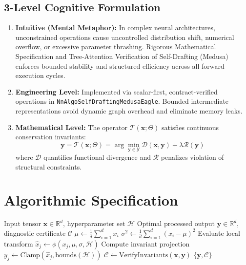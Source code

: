 \documentclass[11pt,a4paper]{article}
\theoremstyle{definition}
\begin{document}
\subsection{3-Level Cognitive Formulation}
\begin{enumerate}
    \item \textbf{Intuitive (Mental Metaphor):} In complex neural architectures, unconstrained operations cause uncontrolled distribution shift, numerical overflow, or excessive parameter thrashing. Rigorous Mathematical Specification and Tree-Attention Verification of Self-Drafting (Medusa) enforces bounded stability and structured efficiency across all forward execution cycles.
    \item \textbf{Engineering Level:} Implemented via scalar-first, contract-verified operations in \texttt{NnAlgoSelfDraftingMedusaEagle}. Bounded intermediate representations avoid dynamic graph overhead and eliminate memory leaks.
    \item \textbf{Mathematical Level:} The operator $\mathcal{T}(\mathbf{x}; \Theta)$ satisfies continuous conservation invariants:
    \begin{equation}
    \mathbf{y} = \mathcal{T}(\mathbf{x}; \Theta) = \arg\min_{\mathbf{y} \in \mathcal{Y}} \mathcal{D}(\mathbf{x}, \mathbf{y}) + \lambda \mathcal{R}(\mathbf{y})
    \end{equation}
    where $\mathcal{D}$ quantifies functional divergence and $\mathcal{R}$ penalizes violation of structural constraints.
\end{enumerate}

\section{Algorithmic Specification}

\begin{algorithm}[H]
\caption{Rigorous Mathematical Specification and Tree-Attention Verification of Self-Drafting (Medusa) Forward Pipeline}
\begin{algorithmic}[1]
\Require Input tensor $\mathbf{x} \in \mathbb{R}^d$, hyperparameter set $\mathcal{H}$
\Ensure Optimal processed output $\mathbf{y} \in \mathbb{R}^d$, diagnostic certificate $\mathcal{C}$
\State $\mu \gets \frac{1}{d} \sum_{i=1}^d x_i$
\State $\sigma^2 \gets \frac{1}{d} \sum_{i=1}^d (x_i - \mu)^2$
    \State Evaluate local transform $\hat{x}_j \gets \phi(x_j, \mu, \sigma, \mathcal{H})$
    \State Compute invariant projection $y_j \gets \text{Clamp}(\hat{x}_j, \text{bounds}(\mathcal{H}))$
\EndFor
\State $\mathcal{C} \gets \text{VerifyInvariants}(\mathbf{x}, \mathbf{y})$
\State \Return $\{\mathbf{y}, \mathcal{C}\}$
\end{algorithmic}
\end{algorithm}
\end{document}
